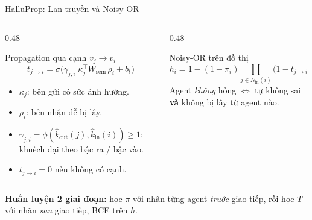 \documentclass[aspectratio=169,10pt]{beamer}
\begin{document}
\begin{frame}{HalluProp: Lan truyền và Noisy-OR}
  \small
  \begin{columns}[T]
    \begin{column}{0.48\textwidth}
      \begin{block}{Propagation qua cạnh $v_j \to v_i$}
        \[ t_{j\to i} = \sigma\bigl(\gamma_{j,i}\; \kappa_j^\top W_{\text{sem}}\, \rho_i + b_t\bigr) \]
        \vspace{-8pt}
        \begin{itemize}
          \item $\kappa_j$: bên gửi có sức ảnh hưởng.
          \item $\rho_i$: bên nhận dễ bị lây.
          \item $\gamma_{j,i} = \phi(\hat k_{\text{out}}(j), \hat k_{\text{in}}(i)) \ge 1$:
            khuếch đại theo bậc ra / bậc vào.
          \item $t_{j\to i} = 0$ nếu không có cạnh.
        \end{itemize}
      \end{block}
    \end{column}
    \begin{column}{0.48\textwidth}
      \begin{block}{Noisy-OR trên đồ thị}
        \[ h_i = 1 - (1-\pi_i) \prod_{j \in N_{\text{in}}(i)} \bigl(1 - t_{j\to i}\, h_j\bigr) \]
        Agent \emph{không} hỏng $\iff$ tự không sai \textbf{và} không bị lây từ agent nào.
      \end{block}
    \end{column}
  \end{columns}
  \vspace{4pt}
  \textbf{Huấn luyện 2 giai đoạn:} học $\pi$ với nhãn từng agent \emph{trước} giao tiếp,
  rồi học $T$ với nhãn \emph{sau} giao tiếp, BCE trên $h$.
\end{frame}
\end{document}
